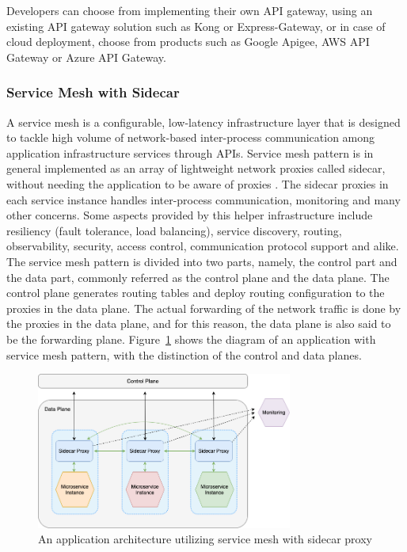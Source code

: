 \documentclass{Configuration_Files/PoliMi3i_thesis}
\begin{document}
Developers can choose from implementing their own API gateway, using an existing API gateway solution such as Kong or Express-Gateway, or in case of cloud deployment, choose from products such as Google Apigee, AWS API Gateway or Azure API Gateway.

\subsubsection{Service Mesh with Sidecar}
\label{subsubsec:service_mesh}

A service mesh is a configurable, low-latency infrastructure layer that is designed to tackle high volume of network-based inter-process communication among  application infrastructure services through APIs.
Service mesh pattern is in general implemented as an array of lightweight network proxies called sidecar, without needing the application to be aware of proxies \cite{li2019service}. The sidecar proxies in each service instance handles inter-process communication, monitoring and many other concerns.
Some aspects provided by this helper infrastructure include resiliency (fault tolerance, load balancing), service discovery, routing, observability, security, access control, communication protocol support and alike.
\\
The service mesh pattern is divided into two parts, namely, the control part and the data part, commonly referred as the control plane and the data plane. The control plane generates routing tables and deploy routing configuration to the proxies in the data plane. The actual forwarding of the network traffic is done by the proxies in the data plane, and for this reason, the data plane is also said to be the forwarding plane. Figure~\ref{fig:service_mesh} shows the diagram of an application with service mesh pattern, with the distinction of the control and data planes.

\begin{figure}[H]
    \centering
    \includegraphics[width=0.75\textwidth]{myImages/mesh.png}
    \caption{An application architecture utilizing service mesh with sidecar proxy}
    \label{fig:service_mesh}
\end{figure}
\end{document}
